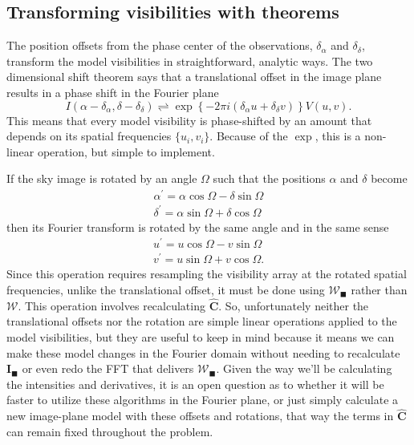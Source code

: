 \documentclass[modern]{aastex62}
\newcommand{\im}{\boldsymbol{I}_\blacksquare}
\newcommand{\vm}{\boldsymbol{\mathcal{W}}} %
\begin{document}
\subsection{Transforming visibilities with theorems}
The position offsets from the phase center of the observations, $\delta_\alpha$ and $\delta_\delta$, transform the model visibilities in straightforward, analytic ways. The two dimensional shift theorem says that a translational offset in the image plane results in a phase shift in the Fourier plane \citep{bracewell00}
\begin{equation}
I(\alpha - \delta_\alpha, \delta - \delta_\delta) \rightleftharpoons \exp \left \{ -2 \pi i (\delta_\alpha u + \delta_\delta v) \right \} V(u, v).
\end{equation}
This means that every model visibility is phase-shifted by an amount that depends on its spatial frequencies $\{u_i, v_i\}$. Because of the $\exp$, this is a non-linear operation, but simple to implement.

If the sky image is rotated by an angle $\Omega$ such that the positions $\alpha$ and $\delta$ become
\begin{eqnarray}
\alpha^\prime = \alpha \cos \Omega - \delta \sin \Omega \label{eqn:rota}\\
\delta^\prime = \alpha \sin \Omega + \delta \cos \Omega \label{eqn:rotd}
\end{eqnarray}
then its Fourier transform is rotated by the same angle and in the same sense \citep{bracewell00}
\begin{eqnarray}
u^\prime = u \cos \Omega - v \sin \Omega \label{eqn:rotu}\\
v^\prime = u \sin \Omega + v \cos \Omega. \label{eqn:rotv}
\end{eqnarray}
Since this operation requires resampling the visibility array at the rotated spatial frequencies, unlike the translational offset, it must be done using $\vm_\blacksquare$ rather than $\vm$. This operation involves recalculating $\hat{\boldsymbol{C}}$. So, unfortunately neither the translational offsets nor the rotation are simple linear operations applied to the model visibilities, but they are useful to keep in mind because it means we can make these model changes in the Fourier domain without needing to recalculate $\im$ or even redo the FFT that delivers $\vm_\blacksquare$. Given the way we'll be calculating the intensities and derivatives, it is an open question as to whether it will be faster to utilize these algorithms in the Fourier plane, or just simply calculate a new image-plane model with these offsets and rotations, that way the terms in $\hat{\boldsymbol{C}}$ can remain fixed throughout the problem.
\end{document}
